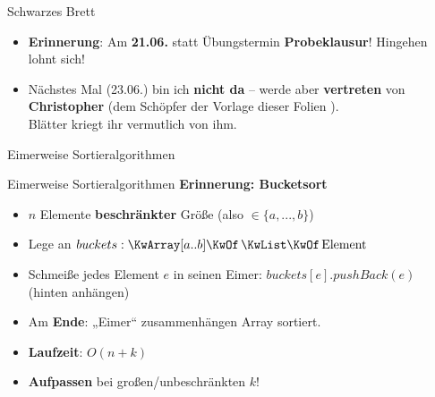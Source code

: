 

\def\haslogo{}



\date{16. Juni \thisyear}



	
	
	\begin{frame}
		\titlepage
	\end{frame}
	

\begin{frame}{Schwarzes Brett}
	\begin{itemize}
		\item \textbf{Erinnerung}: Am \textbf{21.06.} statt Übungstermin \textbf{Probeklausur}! Hingehen lohnt sich!
		\item Nächstes Mal (23.06.) bin ich \textbf{nicht da} – werde aber \textbf{vertreten} von \textbf{Christopher} (dem Schöpfer der Vorlage dieser Folien \smiley). \\
		Blätter kriegt ihr vermutlich von ihm.
	\end{itemize}
\end{frame}
	
\begin{headframe}
	Eimerweise Sortieralgorithmen
\end{headframe}
	
\begin{frame}{Eimerweise Sortieralgorithmen}
	\textbf{Erinnerung: Bucketsort} 
	\begin{itemize}
		\item $n$ Elemente \textbf{beschränkter} Größe (also $\in \{a, ..., b\} $)
		\item Lege an $buckets: \KwArray[a..b] \KwOf \KwListOf \|Element|$ 
		\item Schmeiße jedes Element $e$ in seinen Eimer: $buckets[e].pushBack(e)$ (hinten anhängen)
		\item Am \textbf{Ende}: „Eimer“ zusammenhängen
		\implitem Array sortiert. 
		\item \textbf{Laufzeit}: $O(n+k)$
		\item \textbf{Aufpassen} bei großen/unbeschränkten $k$!
	\end{itemize}
\end{frame}

